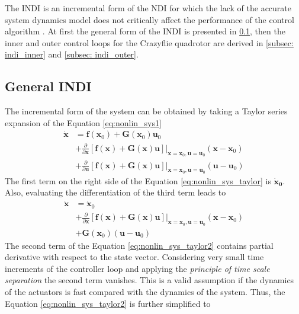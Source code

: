 \documentclass[11pt, a4paper, twoside]{report}
\begin{document}
The \acrshort{INDI} is an incremental form of the \acrshort{NDI} for which the lack of the accurate system dynamics model does not critically affect the performance of the control algorithm \cite{Silva}. At first the general form of the \acrshort{INDI} is presented in \ref{subsec:indi_general}, then the inner and outer control loops for the Crazyflie quadrotor are derived in \ref{subsec: indi_inner} and \ref{subsec: indi_outer}.

\subsection{General INDI} \label{subsec:indi_general}

The incremental form of the system can be obtained by taking a Taylor series expansion of the Equation \ref{eq:nonlin_sys1}
\begin{equation}
	\begin{split}
		\bm{\dot{x}} &= \bm{f}(\bm{x}_0) + \bm{G}(\bm{x}_0)\bm{u}_0 \\
		&+ \frac{\partial}{\partial \bm{x}} [\bm{f}(\bm{x}) + \bm{G}(\bm{x})\bm{u}] \bigg|_{\bm{x}=\bm{x}_0,\bm{u}=\bm{u}_0} (\bm{x}-\bm{x}_0) \\
		&+ \frac{\partial}{\partial \bm{u}} [\bm{f}(\bm{x}) + \bm{G}(\bm{x})\bm{u}] \bigg|_{\bm{x}=\bm{x}_0,\bm{u}=\bm{u}_0} (\bm{u}-\bm{u}_0) 
		\label{eq:nonlin_sys_taylor}
	\end{split}
\end{equation}
The first term on the right side of the Equation \ref{eq:nonlin_sys_taylor} is $\bm{\dot{x}_0}$. Also, evaluating the differentiation of the third term leads to 
\begin{equation}
	\begin{split}
		\bm{\dot{x}} &= \bm{\dot{x}}_0 \\ 
		&+ \frac{\partial}{\partial \bm{x}} [\bm{f}(\bm{x}) + \bm{G}(\bm{x})\bm{u}] \bigg|_{\bm{x}=\bm{x}_0,\bm{u}=\bm{u}_0} (\bm{x}-\bm{x}_0) \\
		&+ \bm{G}(\bm{x}_0) (\bm{u}-\bm{u}_0) 
		\label{eq:nonlin_sys_taylor2}
	\end{split}
\end{equation}
The second term of the Equation \ref{eq:nonlin_sys_taylor2} contains partial derivative with respect to the state vector. Considering very small time increments of the controller loop and applying the \textit{principle of time scale separation} the second term vanishes. This is a valid assumption if the dynamics of the actuators is fast compared with the dynamics of the system. Thus, the Equation \ref{eq:nonlin_sys_taylor2} is further simplified to 
\end{document}
